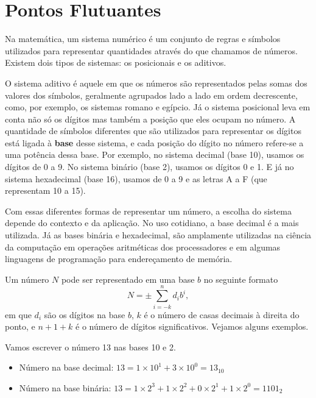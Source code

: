 \chapter{Pontos Flutuantes}

Na matemática, %
um sistema numérico é um conjunto de regras e símbolos utilizados para representar quantidades através do que chamamos de números. %
Existem dois tipos de sistemas: os posicionais e os aditivos. 

O sistema aditivo é aquele em que os números são representados pelas somas dos valores dos símbolos, geralmente agrupados lado a lado em ordem decrescente, como, por exemplo, os sistemas romano e egípcio. Já o sistema posicional leva em conta não só os dígitos mas também a posição que eles ocupam no número. %
A quantidade de símbolos diferentes que são utilizados para representar os dígitos está ligada à \textbf{base} desse sistema, e cada posição do dígito no número refere-se a uma potência dessa base. Por exemplo, no sistema decimal (base 10), usamos os dígitos de 0 a 9. No sistema binário (base 2), usamos os dígitos 0 e 1. E já no sistema hexadecimal (base 16), usamos de 0 a 9 e as letras A a F (que representam 10 a 15).

Com essas diferentes formas de representar um número, a escolha do sistema depende do contexto e da aplicação. No uso cotidiano, a base decimal é a mais utilizada. Já as bases binária e hexadecimal, são amplamente utilizadas na ciência da computação em operações aritméticas dos processadores e em algumas linguagens de programação para endereçamento de memória.

Um número $N$ pode ser representado em uma base \(b\) no seguinte formato
\begin{equation}
N = \pm \sum_{i=-k}^{n} d_i b^i,
\end{equation}
em que \(d_i\) são os dígitos na base \(b\), \(k\) é o número de casas decimais à direita do ponto, e \(n+1+k\) é o número de dígitos significativos. Vejamos alguns exemplos.

\begin{ex}
Vamos escrever o número 13 nas bases 10 e 2.
\begin{itemize}
    \item Número na base decimal: $ 13 = 1 \times 10^1 + 3 \times 10^0 = 13_{10}$
    \item Número na base binária: $ 13 = 1 \times 2^3 + 1 \times 2^2 + 0  \times 2^1 + 1 \times 2^0  = 1101_2$
\end{itemize}
\end{ex}

